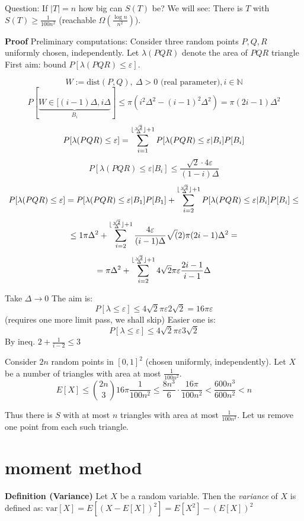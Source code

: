 \documentclass[a4paper]{article}
\DeclarePairedDelimiter\floor{\lfloor}{\rfloor}
\begin{document}
Question: If $|T| = n$ how big can $S(T)$ be?
We will see: There is $T$ with $S(T) \geq \frac{1}{100n^2}$ (reachable $\Omega\left(\frac{\log n}{n^2}\right)$).

\textbf{Proof}
Preliminary computations:
Consider three random points $P,Q,R$ uniformly chosen, independently.
Let $\lambda(PQR)$ denote the area of $PQR$ triangle
First aim: bound $P[\lambda(PQR) \leq \varepsilon]$.

$$W := \text{dist}(P,Q),\:\Delta > 0\text{ (real parameter)}, i \in \mathbb{N}$$
$$P[\underbrace{W \in [(i-1)\Delta, i\Delta}_{B_i}] \leq \pi(i^2\Delta^2 - (i-1)^2\Delta^2) = \pi(2i-1)\Delta^2$$
$$P[\lambda(PQR) \leq \varepsilon] = \sum_{i=1}^{\floor{\frac{\sqrt{2}}{\Delta}} + 1} P[\lambda(PQR) \leq \varepsilon|B_i] P[B_i]$$
$$P[\lambda(PQR) \leq \varepsilon | B_i] \leq \frac{\sqrt{2} \cdot 4\varepsilon}{(1-i) \Delta}$$
$$P[\lambda(PQR) \leq \varepsilon] = P[\lambda(PQR) \leq \varepsilon | B_1] P[B_1] + \sum_{i=2}^{\floor{\frac{\sqrt{2}}{\Delta}} + 1} P[\lambda(PQR) \leq \varepsilon | B_i] P[B_i] \leq $$
$$\leq 1 \pi \Delta^2 + \sum_{i=2}^{\floor{\frac{\sqrt{2}}{\Delta}} + 1} \frac{4 \varepsilon}{(i-1) \Delta} \sqrt(2) \pi (2i - 1) \Delta^2 =$$
$$= \pi \Delta^2 + \sum_{i=2}^{\floor{\frac{\sqrt{2}}{\Delta}} + 1} 4\sqrt{2} \pi \varepsilon \frac{2i - 1}{i-1} \Delta$$

Take $\Delta \rightarrow 0$
The aim is: $$P[\lambda \leq \varepsilon] \leq 4\sqrt{2} \pi \varepsilon 2 \sqrt{2} = 16 \pi \varepsilon$$
(requires one more limit pass, we shall skip)
Easier one is: $$P[\lambda \leq \varepsilon] \leq 4\sqrt{2} \pi \varepsilon 3 \sqrt{2}$$
By ineq. $2 + \frac{1}{i-2} \leq 3$

Consider $2n$ random points in $[0,1]^2$ (chosen uniformly, independently).
Let $X$ be a number of triangles with area at most $\frac{1}{100n^2}$.
$$E[X] \leq {2n \choose 3} 16 \pi \frac{1}{100 n^2} \leq \frac{8n^3}{6} \cdot \frac{16 \pi}{100 n^2} < \frac{600n^3}{600n^2} < n$$

Thus there is $S$ with at most $n$ triangles with area at most $\frac{1}{100n^2}$.
Let us remove one point from each such triangle.

\section*{ moment method}
\textbf{Definition (Variance)}
Let $X$ be a random variable.
Then the \emph{variance} of $X$ is defined as:
$\text{var}[X] = E[(X-E[X])^2] = E[X^2] - (E[X])^2$
\end{document}
